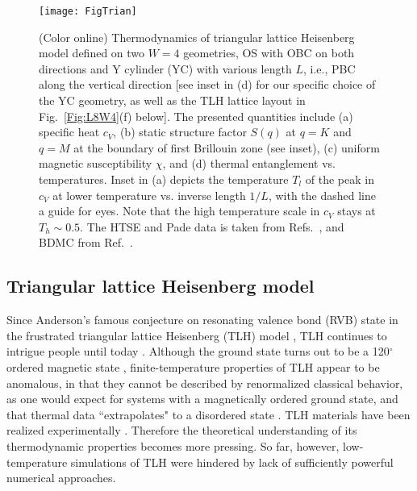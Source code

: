 \documentclass[aps,prx,twocolumn,showpacs,psfig,superscriptaddress,longbibliography]{revtex4-1}
\newcommand{\Fig}[1]{Fig.~\ref{#1}}
\begin{document}
\begin{figure*}[tbp]
\texttt{[image: FigTrian]}
\caption{(Color online)  {Thermodynamics of triangular lattice Heisenberg model defined on two $W=4$ geometries, OS with OBC on both directions and Y cylinder (YC) with various length $L$, i.e., PBC along the vertical direction [see inset in (d)
for our specific 
choice of the YC geometry, as well as the TLH lattice layout in \Fig{Fig:L8W4}(f) 
below].
The presented quantities include (a) specific heat $c_V$,
(b) static structure factor 
$S(q)$ at $q=K$ and $q=M$ 
at the boundary of first Brillouin zone (see inset),
(c) uniform magnetic susceptibility $\chi$, and (d) thermal entanglement vs. temperatures.
Inset in (a) depicts the temperature $T_l$ of the peak in $c_V$
at lower temperature vs. inverse length $1/L$, with the dashed line a guide for eyes.
Note that the high temperature scale in $c_V$ stays at $T_h \sim 0.5$.
The HTSE and Pade data  {is} taken from Refs.~\cite{Elstner-1993,Zheng-2005}, and BDMC from Ref.~\cite{Kulagin2013}.
}}
\label{Fig:TLH}
\end{figure*}

\subsection{ {Triangular lattice Heisenberg model}}
\label{sec:frustrated}

 {Since Anderson's famous conjecture on resonating valence bond (RVB) state
in the frustrated triangular lattice Heisenberg (TLH) model \cite{Anderson1973,ANDERSON1987}, TLH continues %
to intrigue people until today \cite{Elstner-1993,Bernu1994,Bernu01, PhysRevLett.82.3899,White07, Zheng-2005,Zheng-2006,Zheng2006PRL, Kulagin2013,PhysRevLett.120.207203,Alicea06}. 
Although the ground state turns out to be a 120$^{\circ}$ ordered magnetic state \cite{Bernu1994,PhysRevLett.82.3899,White07}, finite-temperature properties of TLH appear to be anomalous, in that they cannot be described by renormalized classical behavior, as one would expect for systems with a magnetically ordered ground state,
and that thermal data  {``extrapolates"} to a disordered state \cite{Elstner-1993,Zheng2006PRL,Zheng-2006,Kulagin2013,Alicea06}.
TLH materials have been realized experimentally \cite{Shirata2012,Zhou2012,Susuki2013,Cui2018}. Therefore the theoretical understanding of its thermodynamic properties becomes more pressing. So far, however, low-temperature simulations of TLH were hindered by lack
of sufficiently powerful numerical approaches.} 
\end{document}
